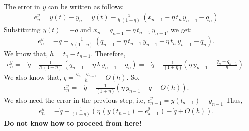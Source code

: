 \begin{enumerate}
\begin{align*}
	\end{align*}
	The error in $y$ can be written as follows:
	\begin{align*}
		e^y_n = y(t) - y_n = y(t) - \frac{1}{h\,\left(1 + \eta\right)}\,\left(x_{n-1} + \eta\,t_n\,y_{n-1} - q_n\right)
	\end{align*}
	Substituting $y(t) = -\dot q$ and $x_n = q_{n-1} - \eta\,t_{n-1}\,y_{n-1}$, we get:
	\begin{align*}
		e^y_n = - \dot q - \frac{1}{h\,\left(1 + \eta\right)}\,\left(q_{n-1} - \eta\,t_{n-1}\,y_{n-1} + \eta\,t_n\,y_{n-1} - q_n\right).
	\end{align*}
	We know that, $h = t_n - t_{n-1}$. Therefore, 
	\begin{align*}
		e^y_n = - \dot q - \frac{1}{h\,\left(1 + \eta\right)}\,\left(q_{n-1} + \eta\,h\,y_{n-1} - q_n\right) = -\dot q - \frac{1}{\left(1 + \eta\right)}\left(\eta\,y_{n-1} - \frac{q_n - q_{n-1}}{h}\right).
	\end{align*}	
	We also know that, $\dot q = \frac{q_n - q_{n-1}}{h} + O(h)$. So,
	\begin{align*}
		e^y_n = -\dot q - \frac{1}{\left(1 + \eta\right)}\left(\eta\,y_{n-1} - \dot q + O(h)\right).
	\end{align*}
	We also need the error in the previous step, i.e, $e^y_{n-1} = y(t_{n-1}) - y_{n-1}$ Thus,
	\begin{align*}
		e^y_n = -\dot q - \frac{1}{\left(1 + \eta\right)}\left(\eta\,\left(y(t_{n-1}) - e^y_{n-1}\right) - \dot q + O(h)\right).
	\end{align*}
	\textbf{Do not know how to proceed from here!}
\end{enumerate}


